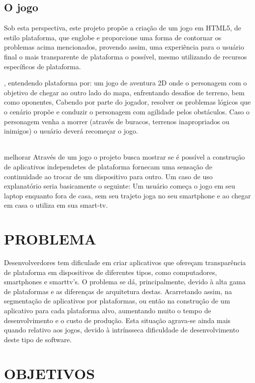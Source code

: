 \documentclass{article}
\begin{document}
\subsection{O jogo}

Sob esta perspectiva, este projeto propõe  a criação de um jogo em HTML5, de estilo plataforma, que englobe e proporcione uma forma de contornar os problemas acima mencionados, provendo assim, uma experiência para o usuário final o mais transparente de plataforma o possível, mesmo utilizando de recursos específicos de plataforma.

, entendendo plataforma por: um jogo de aventura 2D onde o personagem com o objetivo de chegar ao outro lado do mapa, enfrentando desafios de terreno, bem como oponentes, Cabendo por parte do jogador, resolver os problemas lógicos que o cenário propõe e conduzir o personagem com agilidade pelos obstáculos. Caso o personagem venha a morrer (através de buracos, terrenos inapropriados ou inimigos) o usuário deverá recomeçar o jogo. 

\\melhorar
Através de um jogo o projeto busca mostrar se é possível a construção de aplicativos independetes de plataforma fornecam uma sensação de continuidade ao trocar de um dispositivo para outro. Um caso de uso explanatório seria basicamente o seguinte: Um usuário começa o jogo em seu laptop enquanto fora de casa, sem seu trajeto joga no seu smartphone e ao chegar em casa o utiliza em sua smart-tv.

\section{PROBLEMA}

Desenvolverdores tem dificulade em criar aplicativos que ofereçam transparência de plataforma em dispositivos de diferentes tipos, como computadores, smartphones e smarttv's. O problema se dá, principalmente, devido à alta gama de plataformas e as diferenças de arquitetura destas. Acarretando assim, na segmentação de aplicativos por plataformas, ou então na construção de um aplicativo para cada plataforma alvo, aumentando muito o tempo de desenvolvimento e o custo de produção. Esta situação agrava-se ainda mais quando relativo aos jogos, devido à intrínsseca dificuldade de desenvolvimento deste tipo de software. 

\section{OBJETIVOS}
\end{document}
